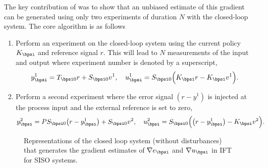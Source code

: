 The key contribution of \cite{HGG94} was to show that an unbiased estimate of this gradient can be generated using only two experiments of duration $N$ with the closed-loop system.
The core algorithm is as follows
\begin{enumerate}[	(1)]
\item Perform an experiment on the closed-loop system using the current policy $K_{\bpsi}$ and reference signal $r$. This will lead to $N$ measurements of the input and output where experiment number is denoted by a superscript,
\begin{equation}
y_{\bpsi}^1 = T_{\bpsi 0} r + S_{\bpsi 0} v^1,
\quad u_{\bpsi}^1 = S_{\bpsi 0}\Big( K_{\bpsi} r - K_{\bpsi} v^1\Big).
\end{equation}
%
\item Perform a second experiment where the error signal $(r - y^1)$ is injected at the process input and the external reference is set to zero,
\begin{equation}
y_{\bpsi}^2 = PS_{\bpsi 0} \big(r - y_{\bpsi}^1\big) + S_{\bpsi 0} v^2,
\quad u_{\bpsi}^2 = S_{\bpsi 0}\Big( \big(r - y_{\bpsi}^1\big) - K_{\bpsi} v^2\Big).
\end{equation}
\end{enumerate}


\begin{figure}
\centering
{}
\caption{Representations of the closed loop system (without disturbances) that generates the gradient estimates of $\nabla  e_{\bpsi}$ and $\nabla  u_{\bpsi}$ in IFT for SISO systems.}
\end{figure}


